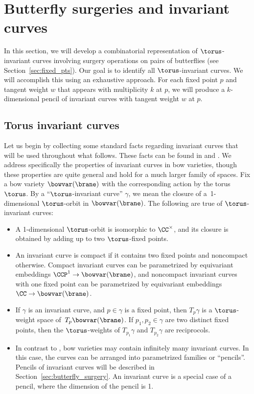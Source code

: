 \section{Butterfly surgeries and invariant curves} \label{sec:curves}
In this section, we will develop a combinatorial representation of $\torus$-invariant curves involving surgery operations on pairs of butterflies (see Section~\ref{sec:fixed_pts}). Our goal is to identify all $\torus$-invariant curves. We will accomplish this using an exhaustive approach. For each fixed point $p$ and tangent weight $w$ that appears with multiplicity $k$ at $p$, we will produce a $k$-dimensional pencil of invariant curves with tangent weight $w$ at $p$.


\subsection{Torus invariant curves} \label{sec:invariant_curves}
Let us begin by collecting some standard facts regarding invariant curves that will be used throughout what follows. These facts can be found in \cite[Section~7]{GKM} and \cite[Section~7.2]{equiv_coh}. We address specifically the properties of invariant curves in bow varieties, though these properties are quite general and hold for a much larger family of spaces. Fix a bow variety $\bowvar(\brane)$ with the corresponding action by the torus $\torus$. By a ``$\torus$-invariant curve'' $\gamma$, we mean the closure of a~1-dimensional $\torus$-orbit in $\bowvar(\brane)$. The following are true of $\torus$-invariant curves:
\begin{itemize}\itemsep=0pt
\item A 1-dimensional $\torus$-orbit is isomorphic to $\CC^\times$, and its closure is obtained by adding up to two $\torus$-fixed points.
\item An invariant curve is compact if it contains two fixed points and noncompact otherwise. Compact invariant curves can be parametrized by equivariant embeddings $\CCP^1 \to \bowvar(\brane)$, and noncompact invariant curves with one fixed point can be parametrized by equivariant embeddings $\CC \to \bowvar(\brane)$.
\item If $\gamma$ is an invariant curve, and $p \in \gamma$ is a fixed point, then $T_p \gamma$ is a $\torus$-weight space of~$T_p \bowvar(\brane)$. If $p_1, p_2 \in \gamma$ are two distinct fixed points, then the $\torus$-weights of $T_{p_1}\gamma$ and $T_{p_2}\gamma$ are reciprocols.
\item In contrast to \cite{GKM}, bow varieties may contain infinitely many invariant curves. In this case, the curves can be arranged into parametrized families or ``pencils''. Pencils of invariant curves will be described in Section~\ref{sec:butterfly_surgery}. An invariant curve is a special case of a pencil, where the dimension of the pencil is 1.
\end{itemize}

